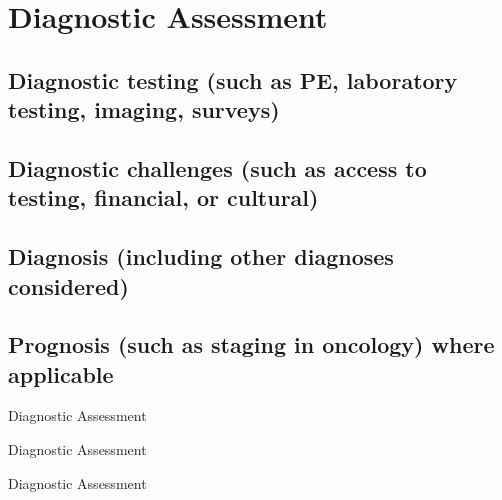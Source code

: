 \section{Diagnostic Assessment}
\subsection{Diagnostic testing (such as PE, laboratory testing, imaging, surveys)}
\subsection{Diagnostic challenges (such as access to testing, financial, or cultural)}
\subsection{Diagnosis (including other diagnoses considered)}
\subsection{Prognosis (such as staging in oncology) where applicable}

\begin{frame}[shrink=35]{Diagnostic Assessment}
    
\end{frame}

\begin{frame}[shrink=20]{Diagnostic Assessment}
    
\end{frame}

\begin{frame}[shrink=20]{Diagnostic Assessment}
    
\end{frame}
